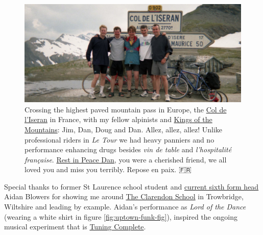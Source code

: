 \documentclass[
]{book}
\begin{document}
\begin{figure}

{\centering \includegraphics[width=1\linewidth]{images/kings-of-the-mountains-col-deliseran} 

}

\caption{Crossing the highest paved mountain pass in Europe, the \href{https://en.wikipedia.org/wiki/Col_de_l\%27Iseran}{Col de l'Iseran} in France, with my fellow alpinists and \href{https://en.wikipedia.org/wiki/King_of_the_Mountains}{Kings of the Mountains}: Jim, Dan, Doug and Dan. Allez, allez, allez! Unlike professional riders in \emph{Le Tour} we had heavy panniers and no performance enhancing drugs besides \emph{vin de table} and \emph{l'hospitalité française}. \href{https://www.wiltshiretimes.co.uk/announcements/deaths/deaths/14828732.Daniel_Feane/}{Rest in Peace Dan}, you were a cherished friend, we all loved you and miss you terribly. Repose en paix. 🇫🇷}\label{fig:bradlads-fig}
\end{figure}



Special thanks to former St Laurence school student and \href{https://st-laurence.com/sixth-form}{current sixth form head} Aidan Blowers for showing me around \href{https://en.wikipedia.org/wiki/The_Clarendon_Academy}{The Clarendon School} in Trowbridge, Wiltshire and leading by example. Aidan's performance as \emph{Lord of the Dance} (wearing a white shirt in figure \ref{fig:uptown-funk-fig}), inspired the ongoing musical experiment that is \href{https://personalpages.manchester.ac.uk/staff/duncan.hull/research\#tuningcomplete}{Tuning Complete}.
\end{document}
